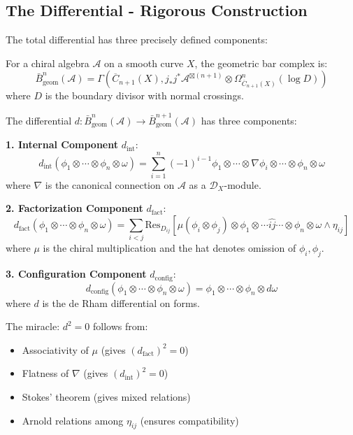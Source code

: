 \subsection{The Differential - Rigorous Construction}
 
The total differential has three precisely defined components:
 
\begin{definition}\label{def:geometric-bar}
For a chiral algebra $\mathcal{A}$ on a smooth curve $X$, the geometric bar complex is:
$$\bar{B}_{\text{geom}}^n(\mathcal{A}) = \Gamma\left(\overline{C}_{n+1}(X), j_*j^*\mathcal{A}^{\boxtimes(n+1)} \otimes \Omega^n_{\overline{C}_{n+1}(X)}(\log D)\right)$$
where $D$ is the boundary divisor with normal crossings.
\end{definition}

\begin{definition}\label{def:bar-diff-detailed}
The differential $d: \bar{B}_{\text{geom}}^n(\mathcal{A}) \to \bar{B}_{\text{geom}}^{n+1}(\mathcal{A})$ has three components:

\textbf{1. Internal Component} $d_{\text{int}}$:
$$d_{\text{int}}(\phi_1 \otimes \cdots \otimes \phi_n \otimes \omega) = 
\sum_{i=1}^n (-1)^{i-1} \phi_1 \otimes \cdots \otimes \nabla\phi_i \otimes \cdots \otimes \phi_n \otimes \omega$$
where $\nabla$ is the canonical connection on $\mathcal{A}$ as a $\mathcal{D}_X$-module.

\textbf{2. Factorization Component} $d_{\text{fact}}$:
$$d_{\text{fact}}(\phi_1 \otimes \cdots \otimes \phi_n \otimes \omega) = 
\sum_{i<j} \text{Res}_{D_{ij}}[\mu(\phi_i \otimes \phi_j) \otimes \phi_1 \otimes \cdots \widehat{ij} \cdots \otimes \phi_n \otimes \omega \wedge \eta_{ij}]$$
where $\mu$ is the chiral multiplication and the hat denotes omission of $\phi_i, \phi_j$.

\textbf{3. Configuration Component} $d_{\text{config}}$:
$$d_{\text{config}}(\phi_1 \otimes \cdots \otimes \phi_n \otimes \omega) = 
\phi_1 \otimes \cdots \otimes \phi_n \otimes d\omega$$
where $d$ is the de Rham differential on forms.

The miracle: $d^2 = 0$ follows from:
\begin{itemize}
\item Associativity of $\mu$ (gives $(d_{\text{fact}})^2 = 0$)
\item Flatness of $\nabla$ (gives $(d_{\text{int}})^2 = 0$)  
\item Stokes' theorem (gives mixed relations)
\item Arnold relations among $\eta_{ij}$ (ensures compatibility)
\end{itemize}
\end{definition}

